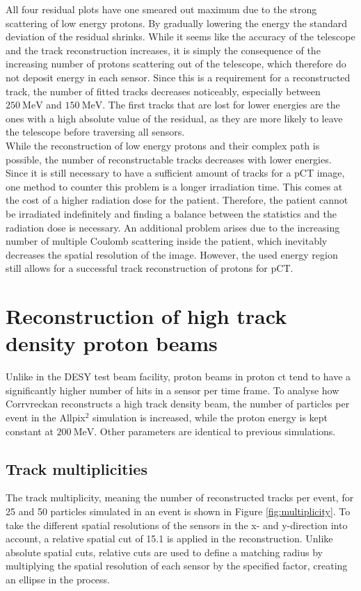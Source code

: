 All four residual plots have one smeared out maximum due to the strong scattering of low energy protons. By gradually lowering the energy the standard deviation of the residual shrinks. While
it seems like the accuracy of the telescope and the track reconstruction increases, it is simply the consequence of the increasing number of protons scattering
out of the telescope, which therefore do not deposit energy in each sensor. Since this is a requirement for a reconstructed track, the number of fitted tracks decreases
noticeably, especially between $\SI{250}{\mega\eV}$ and $\SI{150}{\mega\eV}$. The first tracks that are lost for lower energies
are the ones with a high absolute value of the residual, as they are more likely to leave the telescope before traversing all sensors. \\
While the reconstruction of low energy protons and their complex path is possible, the number of reconstructable tracks decreases with lower energies.
Since it is still necessary to have a sufficient amount of tracks for a pCT image, one method to counter this problem is a longer irradiation time.
This comes at the cost of a higher radiation dose for the patient. Therefore, the patient cannot be irradiated indefinitely and finding a balance between the statistics and the
radiation dose is necessary.
An additional problem arises due to the increasing number of multiple Coulomb scattering inside the patient, which inevitably decreases the spatial resolution of the image.
However, the used energy region still allows for a successful track reconstruction of protons for pCT.


\chapter{Reconstruction of high track density proton beams}\label{sec:density}
Unlike in the DESY test beam facility, proton beams in proton ct tend to have a significantly higher number of hits in a sensor
per time frame. To analyse how Corrvreckan reconstructs a high track density beam, the number of particles per event in the Allpix$^2$
simulation is increased, while the proton energy is kept constant at $\SI{200}{\mega\eV}$. Other parameters are identical to previous simulations.

\section{Track multiplicities}
The track multiplicity, meaning the number of reconstructed tracks per event, for 25 and 50 particles simulated in an event is shown in Figure \ref{fig:multiplicity}. To take the different spatial resolutions of the sensors in the x- and y-direction into account, a relative
spatial cut of 15.1 is applied in the reconstruction. Unlike absolute spatial cuts, relative cuts are used to define a
matching radius by multiplying the spatial resolution
of each sensor by the specified factor, creating an ellipse in the process.

